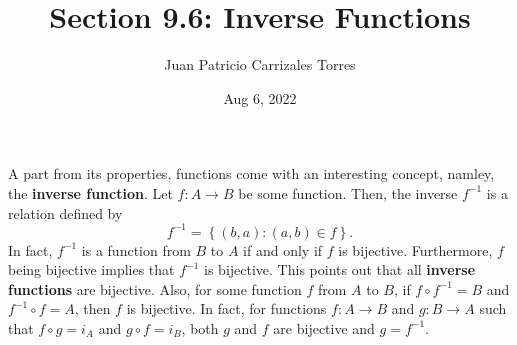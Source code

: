 \documentclass[12pt]{article}
\begin{document}
  
 \title{Section 9.6: Inverse Functions}
   \author{Juan Patricio Carrizales Torres}
     \date{Aug 6, 2022}
       \maketitle

       A part from its properties, functions come with an interesting concept, namley, the \textbf{inverse function}. Let $f:A\to B$ be some function. Then, the inverse $f^{-1}$ is a relation defined by 
    \begin{equation*}
      f^{-1} = \left\{ (b,a):(a,b)\in f \right\}.
    \end{equation*}
    In fact, $f^{-1}$ is a function from $B$ to $A$ if and only if $f$ is bijective. Furthermore, $f$ being bijective implies that $f^{-1}$ is bijective. This points out that all \textbf{inverse functions} are bijective. Also, for some function $f$ from $A$ to $B$, if $f\circ f^{-1} = B$ and $ f^{-1} \circ f= A$, then $f$ is bijective. In fact, for functions $f:A\to B$ and $g: B\to A$ such that $f\circ g = i_{A}$ and $g\circ f = i_{B}$, both $g$ and $f$ are bijective and $g=f^{-1}$.  
\end{document}
